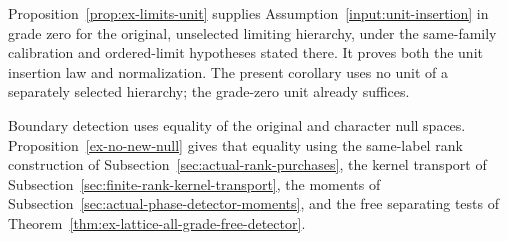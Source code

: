 Proposition~\ref{prop:ex-limits-unit} supplies
Assumption~\ref{input:unit-insertion} in grade zero for the original,
unselected limiting hierarchy, under the same-family calibration and
ordered-limit hypotheses stated there. It proves both the unit insertion
law and normalization. The present corollary uses no unit of a separately
selected hierarchy; the grade-zero unit already suffices.

Boundary detection uses equality of the original and character null
spaces. Proposition~\ref{ex-no-new-null} gives that equality using the
same-label rank construction of Subsection~\ref{sec:actual-rank-purchases},
the kernel transport of Subsection~\ref{sec:finite-rank-kernel-transport},
the moments of Subsection~\ref{sec:actual-phase-detector-moments}, and the
free separating tests of Theorem~\ref{thm:ex-lattice-all-grade-free-detector}.
